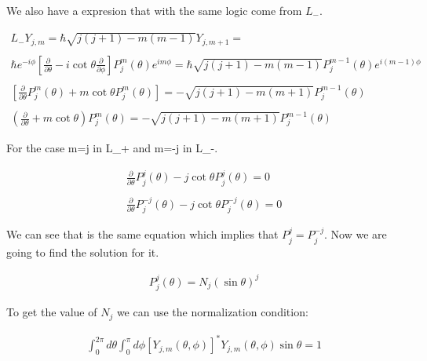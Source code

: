 We also have a expresion that with the same logic come from $L_-$.

\begin{equation}
  \begin{array}{c}
    L_- Y_{j,m} = \hbar \sqrt{j(j+1)-m(m-1)}Y_{j,m+1} =
    \\

    \\
    \hbar e^{-i\phi}\left[\frac{\partial}{\partial \theta}-i\cot\theta\frac{\partial}{\partial \phi}\right]P_j^m(\theta)e^{im\phi} = \hbar\sqrt{j(j+1)-m(m-1)}P_j^{m-1}(\theta)e^{i(m-1)\phi}
    \\

    \\
    \left[\frac{\partial}{\partial \theta}P_j^m(\theta) +m\cot{\theta}P_j^m(\theta)\right] = -\sqrt{j(j+1)-m(m+1)}P_j^{m-1}(\theta)
    \\

    \\
    \left(\frac{\partial}{\partial\theta}+m\cot\theta\right)P_j^m(\theta) = -\sqrt{j(j+1)-m(m+1)}P_j^{m-1}(\theta)
  \end{array}
\end{equation}

For the case m=j in L_+ and m=-j in L_-.

\begin{equation}
  \begin{array}{c}
    \frac{\partial}{\partial\theta} P_j^j(\theta) - j\cot\theta P_j^j(\theta) = 0
    \\

    \\
    \frac{\partial}{\partial\theta} P_j^{-j}(\theta) - j\cot\theta P_j^{-j}(\theta) = 0
  \end{array}
\end{equation}

We can see that is the same equation which implies that $P_j^j = P_j^{-j}$. Now we are going to find the solution for it.

\begin{equation}
  \begin{array}{c}
    P_j^j(\theta) = N_j (\sin\theta)^j
  \end{array}
\end{equation}

To get the value of $N_j$ we can use the normalization condition:

\begin{equation}
  \begin{array}{c}
    \int_{0}^{2\pi}d\theta\int_{0}^{\pi}d\phi[Y_{j,m}(\theta,\phi)]^*Y_{j,m}(\theta,\phi)\sin\theta = 1
  \end{array}
\end{equation}

